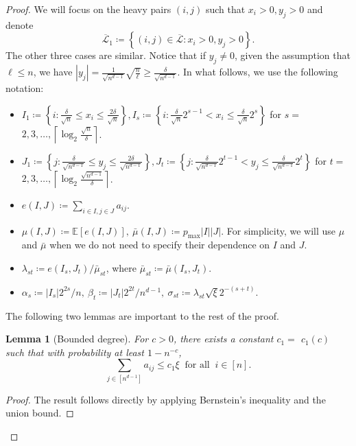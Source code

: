 \documentclass{article}
\theoremstyle{plain}
\newtheorem{lemma}[theorem]{Lemma}
\theoremstyle{definition}
\theoremstyle{remark}
\begin{document}
\begin{appendix}
\begin{center}
\begin{proof}
			We will focus on the heavy pairs $(i, j)$ such that $x_i>0, y_j>0$ and denote
			$$
			\overline{\mathcal{L}}_1 \coloneqq \left\{(i, j) \in \overline{\mathcal{L}}: x_i>0, y_j>0\right\}.
			$$
			The other three cases are similar. Notice that if $y_j \neq 0$, given the assumption that $\ell \leq n$, we have $|y_j| = \frac{1}{\sqrt{n^{d-1}}}\sqrt{ \frac{n}{\ell}} \geq \frac{\delta}{\sqrt{n^{d-1}}}$. In what follows, we use the following notation:
			\begin{itemize}
				\item $I_1 \coloneqq \left\{i: \frac{\delta}{\sqrt{n}} \leq x_i \leq \frac{2 \delta}{\sqrt{n}}\right\}, I_s \coloneqq \left\{i: \frac{\delta}{\sqrt{n}} 2^{s-1}<x_i \leq \frac{\delta}{\sqrt{n}} 2^s\right\}$ for $s=$ $2,3, \ldots,\left\lceil\log _2 \frac{\sqrt{n}}{\delta}\right\rceil$.
    \item $J_1 \coloneqq \left\{j: \frac{\delta}{\sqrt{n^{d-1}}} \leq y_j \leq \frac{2 \delta}{\sqrt{n^{d-1}}}\right\}, J_t \coloneqq \left\{j: \frac{\delta}{\sqrt{n^{d-1}}} 2^{t-1}<y_j \leq \frac{\delta}{\sqrt{n^{d-1}}} 2^t\right\}$ for $t=$ $2,3, \ldots,\left\lceil\log _2 \frac{\sqrt{n^{d-1}}}{\delta}\right\rceil$.
				\item $e(I, J) \coloneqq \sum_{i \in I, j \in J} a_{i j}$.
				\item $\mu(I, J) \coloneqq \mathbb{E}[e(I, J)],~\bar{\mu}(I, J) \coloneqq p_{\max }|I||J|$. For simplicity, we will use $\mu$ and $\bar{\mu}$ when we do not need to specify their dependence on $I$ and $J$.
				\item $\lambda_{s t} \coloneqq e\left(I_s, J_t\right) / \bar{\mu}_{s t}$, where $\bar{\mu}_{s t} \coloneqq \bar{\mu}\left(I_s, J_t\right)$.
				\item $\alpha_s \coloneqq \left|I_s\right| 2^{2 s} / n,~ \beta_t \coloneqq \left|J_t\right| 2^{2 t} / n^{d-1},~\sigma_{s t} \coloneqq \lambda_{s t} \sqrt{\xi} 2^{-(s+t)}$.
			\end{itemize}
			The following two lemmas are important to the rest of the proof.
			\begin{lemma}[Bounded degree]\label{lemma: rwosumconcentration}
				For $c>0$, there exists a constant $c_1=$ $c_1(c)$ such that with probability at least $1-n^{-c}$,
				\begin{equation} \label{eq: sumnk-1bou}
					\sum_{j\in[n^{d-1}]}a_{ij} \leq c_1 \xi~\text{ for all }~i \in [n].
				\end{equation}
			\end{lemma}
			\begin{proof}
				The result follows directly by applying Bernstein's inequality and the union bound.
			\end{proof}
			

\end{proof}
\end{center}
\end{appendix}
\end{document}
